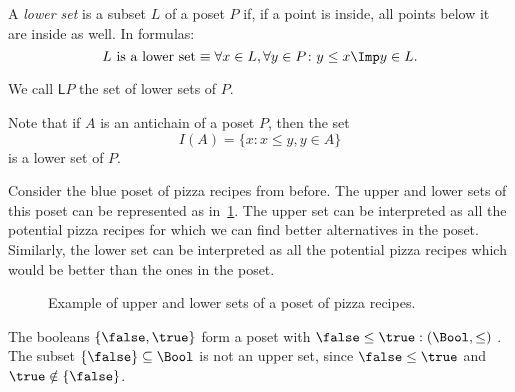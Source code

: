 \begin{definition}
\label{def:lowerset}
A \emph{lower set} is a subset $L$ of a poset $P$ if, if a point is inside, all points below it are inside as well. In formulas:
\begin{equation}
\text{$L$ is a lower set} \equiv \forall x\in L, \forall y\in P\colon y\leq x \Imp y\in L.
\end{equation}
\end{definition}
\begin{remark}
We call $\mathsf{L}P$ the set of lower sets of $P$.
\end{remark}

\begin{remark}
Note that if $A$ is an antichain of a poset $P$, then the set
\begin{equation}
    I(A)=\{x\colon x\leq y, y\in A\}
\end{equation}
is a lower set of $P$.
\end{remark}



Consider the blue poset of pizza recipes from before. The upper and lower sets of this poset can be represented as in~\cref{fig:upperset}. The upper set can be interpreted as all the potential pizza recipes for which we can find better alternatives in the poset. Similarly, the lower set can be interpreted as all the potential pizza recipes which would be better than the ones in the poset.

\begin{figure}[h!]
\begin{center}
\end{center}
\caption{Example of upper and lower sets of a poset of pizza recipes. \label{fig:upperset}}
\end{figure}
\begin{example}
The booleans $\{\false, \true \}$ form a poset with $\false \leq \true:(\Bool,\leq)$ . The subset $\{\false\} \subseteq \Bool$ is not an upper set, since $\false \leq \true$ and $\true \notin \{\false \}$.	
\end{example}

